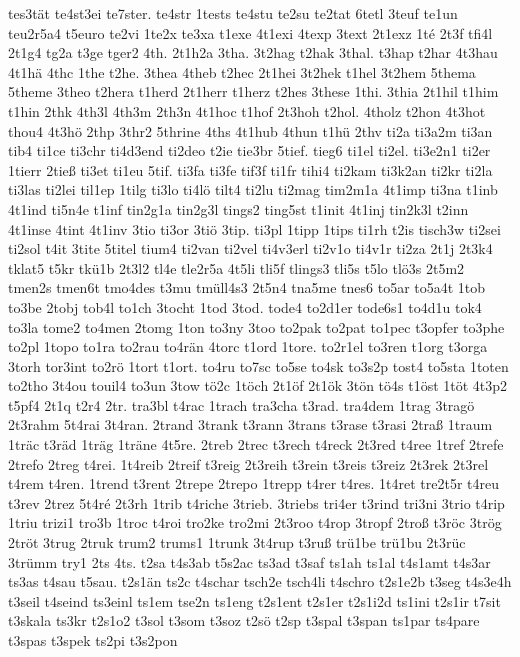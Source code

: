 {tes3tät
te4st3ei
te7ster.
te4str
1tests
te4stu
te2su
te2tat
6tetl
3teuf
te1un
teu2r5a4
t5euro
te2vi
1te2x
te3xa
t1exe
4t1exi
4texp
3text
2t1exz
1té
2t3f
tfi4l
2t1g4
tg2a
t3ge
tger2
4th.
2t1h2a
3tha.
3t2hag
t2hak
3thal.
t3hap
t2har
4t3hau
4t1hä
4thc
1the
t2he.
3thea
4theb
t2hec
2t1hei
3t2hek
t1hel
3t2hem
5thema
5theme
3theo
t2hera
t1herd
2t1herr
t1herz
t2hes
3these
1thi.
3thia
2t1hil
t1him
t1hin
2thk
4th3l
4th3m
2th3n
4t1hoc
t1hof
2t3hoh
t2hol.
4tholz
t2hon
4t3hot
thou4
4t3hö
2thp
3thr2
5thrine
4ths
4t1hub
4thun
t1hü
2thv
ti2a
ti3a2m
ti3an
tib4
ti1ce
ti3chr
ti4d3end
ti2deo
t2ie
tie3br
5tief.
tieg6
ti1el
ti2el.
ti3e2n1
ti2er
1tierr
2tieß
ti3et
ti1eu
5tif.
ti3fa
ti3fe
tif3f
ti1fr
tihi4
ti2kam
ti3k2an
ti2kr
ti2la
ti3las
ti2lei
til1ep
1tilg
ti3lo
ti4lö
tilt4
ti2lu
ti2mag
tim2m1a
4t1imp
ti3na
t1inb
4t1ind
ti5n4e
t1inf
tin2g1a
tin2g3l
tings2
ting5st
t1init
4t1inj
tin2k3l
t2inn
4t1inse
4tint
4t1inv
3tio
ti3or
3tiö
3tip.
ti3pl
1tipp
1tips
ti1rh
t2is
tisch3w
ti2sei
ti2sol
t4it
3tite
5titel
tium4
ti2van
ti2vel
ti4v3erl
ti2v1o
ti4v1r
ti2za
2t1j
2t3k4
tklat5
t5kr
tkü1b
2t3l2
tl4e
tle2r5a
4t5li
tli5f
tlings3
tli5s
t5lo
tlö3s
2t5m2
tmen2s
tmen6t
tmo4des
t3mu
tmüll4s3
2t5n4
tna5me
tnes6
to5ar
to5a4t
1tob
to3be
2tobj
tob4l
to1ch
3tocht
1tod
3tod.
tode4
to2d1er
tode6s1
to4d1u
tok4
to3la
tome2
to4men
2tomg
1ton
to3ny
3too
to2pak
to2pat
to1pec
t3opfer
to3phe
to2pl
1topo
to1ra
to2rau
to4rän
4torc
t1ord
1tore.
to2r1el
to3ren
t1org
t3orga
3torh
tor3int
to2rö
1tort
t1ort.
to4ru
to7sc
to5se
to4sk
to3s2p
tost4
to5sta
1toten
to2tho
3t4ou
touil4
to3un
3tow
tö2c
1töch
2t1öf
2t1ök
3tön
tö4s
t1öst
1töt
4t3p2
t5pf4
2t1q
t2r4
2tr.
tra3bl
t4rac
1trach
tra3cha
t3rad.
tra4dem
1trag
3tragö
2t3rahm
5t4rai
3t4ran.
2trand
3trank
t3rann
3trans
t3rase
t3rasi
2traß
1traum
1träc
t3räd
1träg
1träne
4t5re.
2treb
2trec
t3rech
t4reck
2t3red
t4ree
1tref
2trefe
2trefo
2treg
t4rei.
1t4reib
2treif
t3reig
2t3reih
t3rein
t3reis
t3reiz
2t3rek
2t3rel
t4rem
t4ren.
1trend
t3rent
2trepe
2trepo
1trepp
t4rer
t4res.
1t4ret
tre2t5r
t4reu
t3rev
2trez
5t4ré
2t3rh
1trib
t4riche
3trieb.
3triebs
tri4er
t3rind
tri3ni
3trio
t4rip
1triu
trizi1
tro3b
1troc
t4roi
tro2ke
tro2mi
2t3roo
t4rop
3tropf
2troß
t3röc
3trög
2tröt
3trug
2truk
trum2
trums1
1trunk
3t4rup
t3ruß
trü1be
trü1bu
2t3rüc
3trümm
try1
2ts
4ts.
t2sa
t4s3ab
t5s2ac
ts3ad
t3saf
ts1ah
ts1al
t4s1amt
t4s3ar
ts3as
t4sau
t5sau.
t2s1än
ts2c
t4schar
tsch2e
tsch4li
t4schro
t2s1e2b
t3seg
t4s3e4h
t3seil
t4seind
ts3einl
ts1em
tse2n
ts1eng
t2s1ent
t2s1er
t2s1i2d
ts1ini
t2s1ir
t7sit
t3skala
ts3kr
t2s1o2
t3sol
t3som
t3soz
t2sö
t2sp
t3spal
t3span
ts1par
ts4pare
t3spas
t3spek
ts2pi
t3s2pon
}
